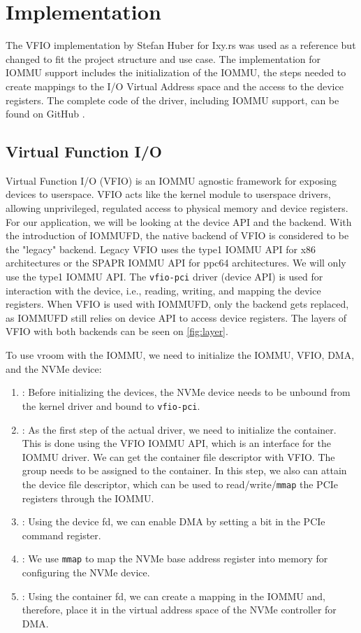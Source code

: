 \chapter{Implementation} \label{c:impl}

The VFIO implementation by Stefan Huber for Ixy.rs was used as a reference but changed to fit the project structure and use case. The implementation for IOMMU support includes the initialization of the IOMMU, the steps needed to create mappings to the I/O Virtual Address space and the access to the device registers. The complete code of the driver, including IOMMU support, can be found on GitHub \cite{vroomsource}.

\section{Virtual Function I/O}
Virtual Function I/O (VFIO) is an IOMMU agnostic framework for exposing devices to userspace. VFIO acts like the kernel module to userspace drivers, allowing unprivileged, regulated access to physical memory and device registers. For our application, we will be looking at the device API and the backend. With the introduction of IOMMUFD, the native backend of VFIO is considered to be the "legacy" backend. Legacy VFIO uses the type1 IOMMU API for x86 architectures or the SPAPR IOMMU API for ppc64 architectures. We will only use the type1 IOMMU API. The \texttt{vfio-pci} driver (device API) is used for interaction with the device, i.e., reading, writing, and mapping the device registers. When VFIO is used with IOMMUFD, only the backend gets replaced, as IOMMUFD still relies on device API to access device registers.
The layers of VFIO with both backends can be seen on \autoref{fig:layer}.

To use vroom with the IOMMU, we need to initialize the IOMMU, VFIO, DMA, and the NVMe device:
\begin{enumerate}
    \item \textbf{}: Before initializing the devices, the NVMe device needs to be unbound from the kernel driver and bound to \texttt{vfio-pci}.
    \item \textbf{}: As the first step of the actual driver, we need to initialize the container. This is done using the VFIO IOMMU API, which is an interface for the IOMMU driver. We can get the container file descriptor with VFIO. The group needs to be assigned to the container. In this step, we also can attain the device file descriptor, which can be used to read/write/\texttt{mmap} the PCIe registers through the IOMMU.
    \item \textbf{}: Using the device fd, we can enable DMA by setting a bit in the PCIe command register.
    \item \textbf{}: We use \texttt{mmap} to map the NVMe base address register into memory for configuring the NVMe device.
    \item \textbf{}: Using the container fd, we can create a mapping in the IOMMU and, therefore, place it in the virtual address space of the NVMe controller for DMA.
\end{enumerate}

